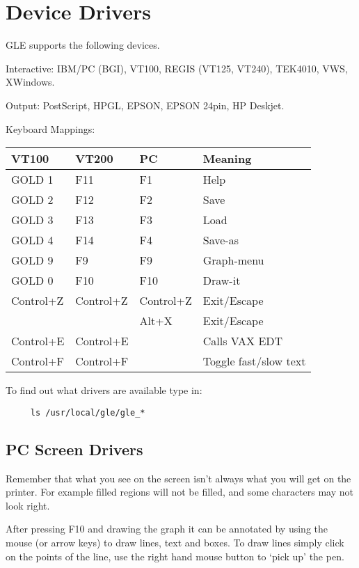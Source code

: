    
  
\section{Device Drivers}
GLE supports the following devices.

Interactive: IBM/PC (BGI), VT100, REGIS (VT125, VT240), TEK4010, VWS, XWindows.

Output: PostScript, HPGL, EPSON, EPSON 24pin, HP Deskjet.

Keyboard Mappings:
\begin{center}
\begin{tabular}{|l|l|l|l|} \hline
VT100  & VT200 &  PC	& Meaning	\\ \hline
GOLD 1 & F11  & F1	& Help 		\\
GOLD 2 & F12  & F2	& Save		\\ 
GOLD 3 & F13  & F3	& Load		\\
GOLD 4 & F14  & F4	& Save-as	\\
GOLD 9 & F9   & F9   	& Graph-menu	\\
GOLD 0 & F10  & F10  	& Draw-it 	\\ 
Control+Z & Control+Z & Control+Z 	& Exit/Escape \\
& & Alt+X		& Exit/Escape \\
Control+E & Control+E  & 	& Calls VAX EDT	\\
Control+F & Control+F  & 	& Toggle fast/slow text \\ \hline
\end{tabular}
\end{center}
To find out what drivers are available type in:
\begin{verbatim} 
     ls /usr/local/gle/gle_*
\end{verbatim}
\subsection{PC Screen Drivers}
Remember that what you see on the screen isn't always what you will
get on the printer.  For example filled regions will not be filled,
and some characters may not look right.

After pressing F10 and drawing the graph it can be annotated by using 
the mouse (or arrow keys) to draw lines, text and boxes.  
To draw lines simply click on the points of the line, use the right
hand mouse button to `pick up' the pen.  

